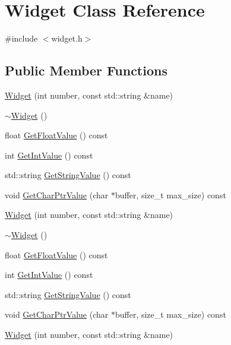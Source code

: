 \hypertarget{class_widget}{}\section{Widget Class Reference}
\label{class_widget}


{\ttfamily \#include $<$widget.\+h$>$}

\subsection*{Public Member Functions}
\begin{DoxyCompactItemize}
\item 
\mbox{\hyperlink{class_widget_ab573b75a8a69d29c298af2485fb9cda9}{Widget}} (int number, const std\+::string \&name)
\item 
\mbox{\hyperlink{class_widget_aa24f66bcbaaec6d458b0980e8c8eae65}{$\sim$\+Widget}} ()
\item 
float \mbox{\hyperlink{class_widget_abf639d975e02cabda8132873aca1a333}{Get\+Float\+Value}} () const
\item 
int \mbox{\hyperlink{class_widget_a15e7d0423020a7a98063a749fb97bdd3}{Get\+Int\+Value}} () const
\item 
std\+::string \mbox{\hyperlink{class_widget_a7a6e3a7fca3a9373f631c94dc1494d22}{Get\+String\+Value}} () const
\item 
void \mbox{\hyperlink{class_widget_a50791a556979f22f5593383143c7f815}{Get\+Char\+Ptr\+Value}} (char $\ast$buffer, size\+\_\+t max\+\_\+size) const
\item 
\mbox{\hyperlink{class_widget_ab573b75a8a69d29c298af2485fb9cda9}{Widget}} (int number, const std\+::string \&name)
\item 
\mbox{\hyperlink{class_widget_aa24f66bcbaaec6d458b0980e8c8eae65}{$\sim$\+Widget}} ()
\item 
float \mbox{\hyperlink{class_widget_abf639d975e02cabda8132873aca1a333}{Get\+Float\+Value}} () const
\item 
int \mbox{\hyperlink{class_widget_a15e7d0423020a7a98063a749fb97bdd3}{Get\+Int\+Value}} () const
\item 
std\+::string \mbox{\hyperlink{class_widget_a7a6e3a7fca3a9373f631c94dc1494d22}{Get\+String\+Value}} () const
\item 
void \mbox{\hyperlink{class_widget_a50791a556979f22f5593383143c7f815}{Get\+Char\+Ptr\+Value}} (char $\ast$buffer, size\+\_\+t max\+\_\+size) const
\item 
\mbox{\hyperlink{class_widget_ab573b75a8a69d29c298af2485fb9cda9}{Widget}} (int number, const std\+::string \&name)

\end{DoxyCompactItemize}
